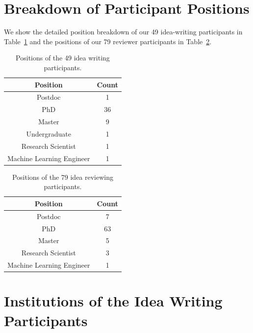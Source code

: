 \newpage



\section{Breakdown of Participant Positions}
\label{sec:participant_positions}


We show the detailed position breakdown of our 49 idea-writing participants in Table~\ref{table:idea_participants_position} and the positions of our 79 reviewer participants in Table~\ref{table:review_participants_position}. 

\begin{table}[h]
\centering
\begin{tabular}{c c} 
 \hline
 Position & Count \\ 
 \hline
Postdoc & 1 \\
PhD & 36 \\
Master & 9 \\
Undergraduate & 1 \\
Research Scientist & 1 \\
Machine Learning Engineer & 1 \\
 \hline
\end{tabular}
\caption{Positions of the 49 idea writing participants.}
\label{table:idea_participants_position}
\end{table}



\begin{table}[h]
\centering
\begin{tabular}{c c} 
 \hline
 Position & Count \\ 
 \hline
Postdoc & 7 \\
PhD & 63 \\
Master & 5 \\
Research Scientist & 3 \\
Machine Learning Engineer & 1 \\
 \hline
\end{tabular}
\caption{Positions of the 79 idea reviewing participants.}
\label{table:review_participants_position}
\end{table}




\newpage





\section{Institutions of the Idea Writing Participants}


